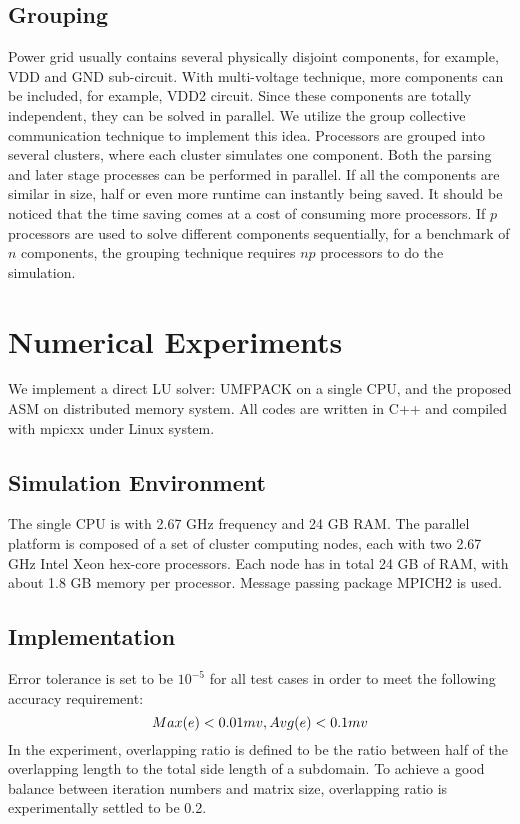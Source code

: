 \documentclass{sig-alternate}
\begin{document}
  \subsection{Grouping} 
	Power grid usually contains several physically disjoint components, for example, VDD and GND sub-circuit. With multi-voltage 
	technique, more components can be included, for example, VDD2 circuit. Since these components are totally independent, they can
	be solved in parallel. We utilize the group collective 
	communication technique to implement this idea. Processors are grouped into several clusters, where each cluster 
	simulates one component. Both the parsing and later stage processes can be performed in parallel. 
	If all the components are similar in size, half or even more runtime can instantly being saved. 
	It should be noticed that the time saving comes at a cost of consuming more processors. If $p$ processors are used to 
	solve different components sequentially, for a benchmark of $n$ components, the grouping technique requires $np$ processors to
	do the simulation.  
\section{Numerical Experiments}
	We implement a direct LU solver: UMFPACK on a single CPU, and the proposed ASM on distributed memory system. 
	All codes are written in C++ and compiled with mpicxx under Linux system. 
  \subsection{Simulation Environment}
	The single CPU is with 2.67 GHz frequency and 24 GB RAM. The parallel platform is composed of a set of cluster 
	computing nodes, each with two 2.67 GHz Intel Xeon hex-core processors. Each node has in total 24 GB of RAM, with about 
	1.8 GB memory per processor. Message passing package MPICH2 is used.  
  \subsection{Implementation}
	Error tolerance is set to be $10^{-5}$ for all test cases in order to meet the following accuracy requirement:
	\begin{equation}
		Max(e) < 0.01 mv, Avg(e) < 0.1 mv\\ \label{eq_err}
	\end{equation}
	In the experiment, overlapping ratio is defined to be the ratio between half of the overlapping length to the total side length of 
	a subdomain. To achieve a good balance between iteration numbers and matrix size, overlapping ratio is experimentally 
	settled to be 0.2.
			
\end{document}
